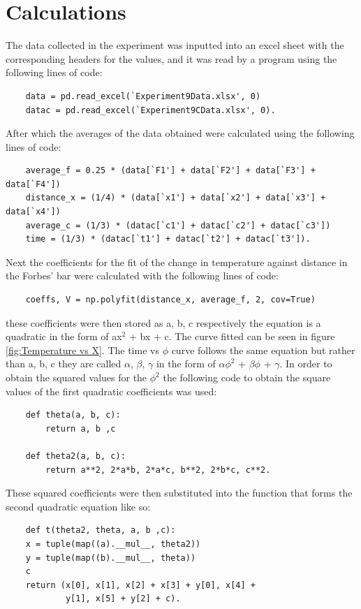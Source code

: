 \documentclass[12pt, a4paper]{article}
\begin{document}
\section*{Calculations}
The data collected in the experiment was inputted into an excel sheet with the corresponding headers for the values, and it was read by a program using the following lines of code:
\begin{verbatim}
    data = pd.read_excel(`Experiment9Data.xlsx', 0)
    datac = pd.read_excel(`Experiment9CData.xlsx', 0).
\end{verbatim}
After which the averages of the data obtained were calculated using the following lines of code:
\begin{verbatim}
    average_f = 0.25 * (data[`F1'] + data[`F2'] + data[`F3'] + data[`F4'])
    distance_x = (1/4) * (data[`x1'] + data[`x2'] + data[`x3'] + data[`x4'])
    average_c = (1/3) * (datac[`c1'] + datac[`c2'] + datac[`c3'])
    time = (1/3) * (datac[`t1'] + datac[`t2'] + datac[`t3']).
\end{verbatim}
Next the coefficients for the fit of the change in temperature against distance in the Forbes' bar were calculated with the following lines of code:
\begin{verbatim}
    coeffs, V = np.polyfit(distance_x, average_f, 2, cov=True)
\end{verbatim}
these coefficients were then stored as a, b, c respectively the equation is a quadratic in the form of ax$^2$ + bx + c. The curve fitted can be seen in figure \ref{fig:Temperature vs X}. The time vs $\phi$ curve follows the same equation but rather than a, b, c they are called $\alpha$, $\beta$, $\gamma$ in the form of $\alpha \phi ^2$ + $\beta \phi$ + $\gamma$. In order to obtain the squared values for the $\phi ^2$ the following code to obtain the square values of the first quadratic coefficients was used:
\begin{verbatim}
    def theta(a, b, c):
        return a, b ,c
 
    def theta2(a, b, c):
        return a**2, 2*a*b, 2*a*c, b**2, 2*b*c, c**2.
\end{verbatim}
These squared coefficients were then substituted into the function that forms the second quadratic equation like so:
\begin{verbatim}
    def t(theta2, theta, a, b ,c):
    x = tuple(map((a).__mul__, theta2))
    y = tuple(map((b).__mul__, theta))
    c
    return (x[0], x[1], x[2] + x[3] + y[0], x[4] + 
            y[1], x[5] + y[2] + c).
\end{verbatim}
\end{document}
